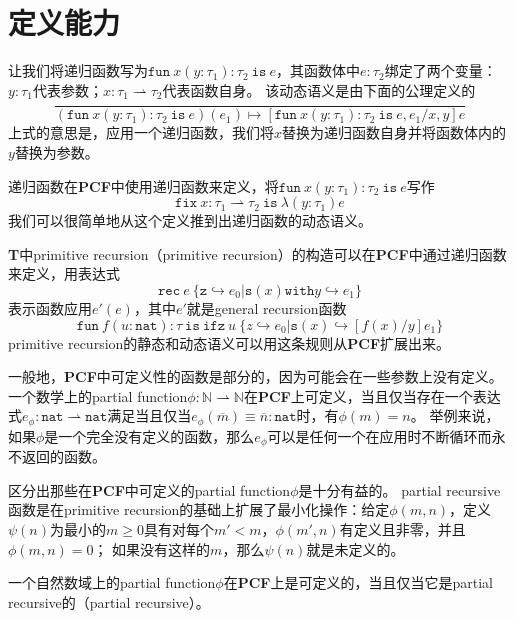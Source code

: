 \section{定义能力}

让我们将递归函数写为\(\mathtt{fun}\ x(y: \tau_1): \tau_2\ \mathtt{is}\ e\)，其函数体中\(e:\tau_2\)绑定了两个变量：\(y: \tau_1\)代表参数；\(x: \tau_1 \rightharpoonup \tau_2\)代表函数自身。
该动态语义是由下面的公理定义的
\[
	\frac{}{
		(\mathtt{fun}\ x(y: \tau_1): \tau_2\ \mathtt{is}\ e)(e_1) \longmapsto [\mathtt{fun}\ x(y: \tau_1): \tau_2\ \mathtt{is}\ e, e_1/x, y]e
	}
\]
上式的意思是，应用一个递归函数，我们将\(x\)替换为递归函数自身并将函数体内的\(y\)替换为参数。

递归函数在\textbf{PCF}中使用递归函数来定义，将\(\mathtt{fun}\ x(y: \tau_1): \tau_2\ \mathtt{is}\ e\)写作
\[
	\mathtt{fix}\ x: \tau_1 \rightharpoonup \tau_2\ \mathtt{is}\ \lambda (y: \tau_1)e
\]
我们可以很简单地从这个定义推到出递归函数的动态语义。

\textbf{T}中\gls{primitive recursion}（primitive recursion）的构造可以在\textbf{PCF}中通过递归函数来定义，用表达式
\[
	\mathtt{rec}\ e\ \{\mathtt{z} \hookrightarrow e_0 | \mathtt{s}(x) \mathtt{with} y \hookrightarrow e_1\}
\]
表示函数应用\(e'(e)\)，其中\(e'\)就是\gls{general recursion}函数
\[
	\mathtt{fun}\ f(u: \mathtt{nat}): \tau\ \mathtt{is}\ \mathtt{ifz}\ u\ \{z \hookrightarrow e_0 | \mathtt{s}(x) \hookrightarrow [f(x)/y]e_1\}
\]
\gls{primitive recursion}的静态和动态语义可以用这条规则从\textbf{PCF}扩展出来。

一般地，\textbf{PCF}中可定义性的函数是部分的，因为可能会在一些参数上没有定义。
一个数学上的\gls{partial function}\(\phi: \mathbb{N} \rightharpoonup \mathbb{N}\)在\textbf{PCF}上可定义，当且仅当存在一个表达式\(e_\phi : \mathtt{nat} \rightharpoonup \mathtt{nat}\)满足当且仅当\(e_\phi(\overline{m}) \equiv \overline{n}: \mathtt{nat}\)时，有\(\phi(m) = n\)。
举例来说，如果\(\phi\)是一个完全没有定义的函数，那么\(e_\phi\)可以是任何一个在应用时不断循环而永不返回的函数。

区分出那些在\textbf{PCF}中可定义的\gls{partial function}\(\phi\)是十分有益的。
\gls{partial recursive}函数是在\gls{primitive recursion}的基础上扩展了最小化操作：给定\(\phi(m, n)\)，定义\(\psi(n)\)为最小的\(m \ge 0\)具有对每个\(m' < m\)，\(\phi(m', n)\)有定义且非零，并且\(\phi(m, n) = 0\)；
如果没有这样的\(m\)，那么\(\psi(n)\)就是未定义的。

\begin{theorem}
	一个自然数域上的\gls{partial function}\(\phi\)在\textbf{PCF}上是可定义的，当且仅当它是\gls{partial recursive}的（partial recursive）。
\end{theorem} 

